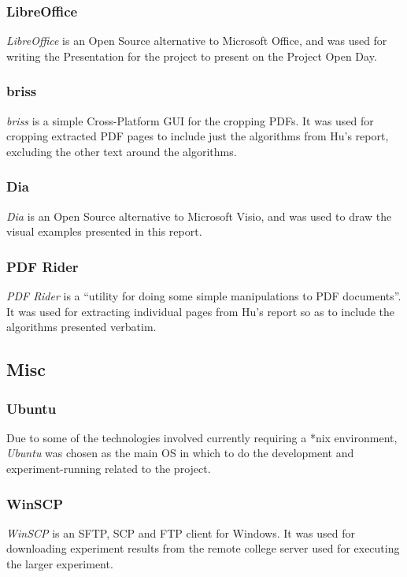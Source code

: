 \documentclass[a4paper,11pt]{report}
\begin{document}
\subsubsection*{LibreOffice}
\emph{LibreOffice} \citep{prog:libreoffice} is an Open Source alternative to Microsoft Office, and was used for writing the Presentation for the project to present on the Project Open Day.

\subsubsection*{briss}
\emph{briss} \citep{prog:briss} is a simple Cross-Platform GUI for the cropping PDFs. It was used for cropping extracted PDF pages to include just the algorithms from Hu's report, excluding the other text around the algorithms.

\subsubsection*{Dia}
\emph{Dia} \citep{prog:dia} is an Open Source alternative to Microsoft Visio, and was used to draw the visual examples presented in this report.

\subsubsection*{PDF Rider}
\emph{PDF Rider} \citep{prog:pdfrider} is a ``utility for doing some simple manipulations to PDF documents''. It was used for extracting individual pages from Hu's report so as to include the algorithms presented verbatim.

\subsection{Misc}

\subsubsection*{Ubuntu}
Due to some of the technologies involved currently requiring a *nix environment, \emph{Ubuntu} \citep{prog:ubuntu} was chosen as the main OS in which to do the development and experiment-running related to the project.

\subsubsection*{WinSCP}
\emph{WinSCP} \citep{prog:winscp} is an SFTP, SCP and FTP client for Windows. It was used for downloading experiment results from the remote college server used for executing the larger experiment.
\end{document}
